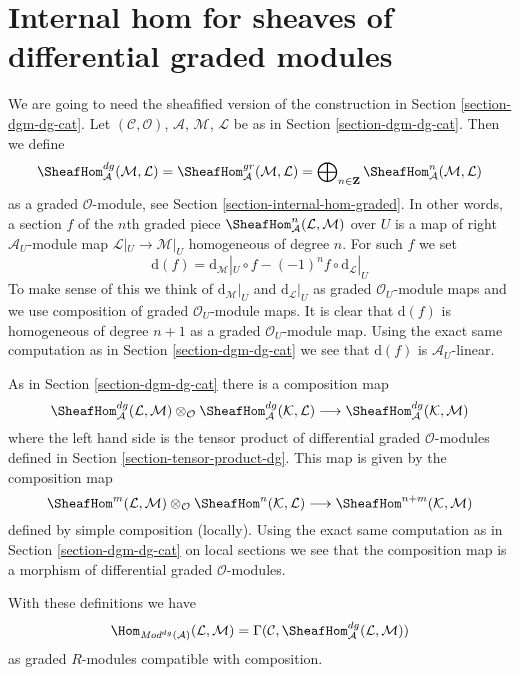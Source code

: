 \section{Internal hom for sheaves of differential graded modules}
\label{section-internal-hom-dg}

\noindent
We are going to need the sheafified version of the construction
in Section \ref{section-dgm-dg-cat}.
Let $(\mathcal{C}, \mathcal{O})$, $\mathcal{A}$,
$\mathcal{M}$, $\mathcal{L}$ be as in Section \ref{section-dgm-dg-cat}.
Then we define
$$
\SheafHom^{dg}_\mathcal{A}(\mathcal{M}, \mathcal{L}) =
\SheafHom^{gr}_\mathcal{A}(\mathcal{M}, \mathcal{L}) =
\bigoplus\nolimits_{n \in \mathbf{Z}}
\SheafHom^n_\mathcal{A}(\mathcal{M}, \mathcal{L})
$$
as a graded $\mathcal{O}$-module, see
Section \ref{section-internal-hom-graded}.
In other words, a section $f$ of the $n$th graded piece
$\SheafHom^n_\mathcal{A}(\mathcal{L}, \mathcal{M})$ over $U$
is a map of right $\mathcal{A}_U$-module map
$\mathcal{L}|_U \to \mathcal{M}|_U$ homogeneous of degree $n$.
For such $f$ we set
$$
\text{d}(f) =
\text{d}_\mathcal{M}|_U \circ f - (-1)^n f \circ \text{d}_\mathcal{L}|_U
$$
To make sense of this we think of $\text{d}_\mathcal{M}|_U$ and
$\text{d}_\mathcal{L}|_U$ as graded $\mathcal{O}_U$-module maps and
we use composition of graded $\mathcal{O}_U$-module maps.
It is clear that $\text{d}(f)$ is homogeneous of
degree $n + 1$ as a graded $\mathcal{O}_U$-module map.
Using the exact same computation as in Section \ref{section-dgm-dg-cat}
we see that $\text{d}(f)$ is $\mathcal{A}_U$-linear.

\medskip\noindent
As in Section \ref{section-dgm-dg-cat} there is a composition map
$$
\SheafHom^{dg}_\mathcal{A}(\mathcal{L}, \mathcal{M}) \otimes_\mathcal{O}
\SheafHom^{dg}_\mathcal{A}(\mathcal{K}, \mathcal{L})
\longrightarrow
\SheafHom^{dg}_\mathcal{A}(\mathcal{K}, \mathcal{M})
$$
where the left hand side is the tensor product of
differential graded $\mathcal{O}$-modules
defined in Section \ref{section-tensor-product-dg}. This map
is given by the composition map
$$
\SheafHom^m(\mathcal{L}, \mathcal{M}) \otimes_\mathcal{O}
\SheafHom^n(\mathcal{K}, \mathcal{L}) \longrightarrow
\SheafHom^{n + m}(\mathcal{K}, \mathcal{M})
$$
defined by simple composition (locally). Using the exact same
computation as in Section \ref{section-dgm-dg-cat} on local sections
we see that the composition map is a morphism of differential
graded $\mathcal{O}$-modules.

\medskip\noindent
With these definitions we have
$$
\Hom_{\textit{Mod}^{dg}(\mathcal{A})}(\mathcal{L}, \mathcal{M}) =
\Gamma(\mathcal{C}, \SheafHom^{dg}_\mathcal{A}(\mathcal{L}, \mathcal{M}))
$$
as graded $R$-modules compatible with composition.









